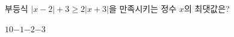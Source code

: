 부등식 $|x-2|+3\ge 2|x+3|$을 만족시키는 정수 $x$의 최댓값은?
\begin{choices32}{$1$}{$0$}{$-1$}{$-2$}{$-3$}\end{choices32}
